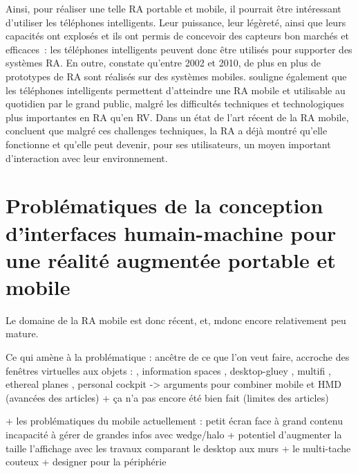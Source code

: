 Ainsi, pour réaliser une telle RA portable et mobile, il pourrait être intéressant d'utiliser les téléphones intelligents. Leur puissance, leur légèreté, ainsi que leurs capacités ont explosés et ils ont permis de concevoir des capteurs bon marchés et efficaces~: les téléphones intelligents peuvent donc être utilisés pour supporter des systèmes RA. \cite{DeSaChurchill2013} En outre, \citet{CarmignianiFurhtAnisettiEtAl2011} constate qu'entre 2002 et 2010, de plus en plus de prototypes de RA sont réalisés sur des systèmes mobiles. \citet{VanKrevelenPoelman2010} souligne également que les téléphones intelligents permettent d'atteindre une RA mobile et utilisable au quotidien par le grand public, malgré les difficultés techniques et technologiques plus importantes en RA qu'en RV. Dans un état de l'art récent de la RA mobile, \citet{HuangHuiPeyloEtAl2013} concluent que malgré ces challenges techniques, la RA a déjà montré qu'elle fonctionne et qu'elle peut devenir, pour ses utilisateurs, un moyen important d’interaction avec leur environnement.


\section*{Problématiques de la conception d'interfaces humain-machine pour une réalité augmentée portable et mobile}
Le domaine de la RA mobile est donc récent, et, mdonc encore relativement peu mature.


Ce qui amène à la problématique : ancêtre de ce que l'on veut faire, accroche des fenêtres virtuelles aux objets : \cite{FeinerMacIntyreHauptEtAl1993}, information spaces \cite{Fitzmaurice1993}, desktop-gluey \cite{SerranoEnsYangEtAl2015}, multifi \cite{GrubertHeinischQuigleyEtAl2015}, ethereal planes \cite{EnsHincapie-RamosIrani2014}, personal cockpit \cite{EnsFinneganIrani2014} -> arguments pour combiner mobile et HMD (avancées des articles) + ça n'a pas encore été bien fait (limites des articles)

+ les problématiques du mobile actuellement : petit écran face à grand contenu 
incapacité à gérer de grandes infos 
avec wedge/halo \cite{BaudischRosenholtz2003} \cite{GustafsonBaudischGutwinEtAl2008} \cite{BurigatChittaro2011} 
+ potentiel d'augmenter la taille l'affichage avec les travaux comparant le desktop aux murs \cite{LiuChapuisBeaudouin-LafonEtAl2014} \cite{ShuppBallYostEtAl2006} \cite{TanGergleScupelliEtAl2003}
+ le multi-tache couteux \cite{EnsFinneganIrani2014} \cite{RashidNacentaQuigley2012a}
+ designer pour la périphérie \cite{JonesBenkoOfekEtAl2013} \cite{CockburnKarlsonBederson2009}

